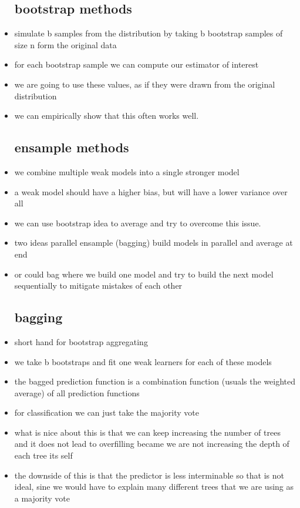 \documentclass{article}
\begin{document}
\begin{itemize}
\subsection*{bootstrap methods}
\item simulate b samples from the distribution by taking b bootstrap samples of size n form the original data
\item for each bootstrap sample we can compute our estimator of interest 
\item we are going to use these values, as if they were drawn from the original distribution
\item we can empirically show that this often works well. 
\subsection*{ensample methods }
\item we combine multiple weak models into a single stronger model 
\item a weak model should have a higher bias, but will have a lower variance over all 
\item we can use bootstrap idea to average and try to overcome this issue.
\item two ideas parallel ensample (bagging) build models in parallel and average at end 
\item or could bag where we build one model and try to build the next model sequentially to mitigate mistakes of each other 
\subsection*{bagging }
\item short hand for bootstrap aggregating 
\item we take b bootstraps and fit one weak learners for each of these models 
\item the bagged prediction function is a combination
function (usuals the weighted average) of all prediction functions 
\item for classification we can just take the majority vote 
\item what is nice about this is that we can keep increasing the number of trees and it does not lead to overfilling became 
we are not increasing the depth of each tree its self
\item the downside of this is that the predictor is less interminable so that is not ideal, sine we would have to explain many different trees that we are using as a majority vote 

\end{itemize}
\end{document}
